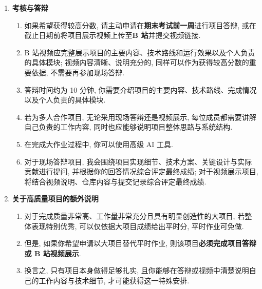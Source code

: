 \documentclass{../nndlcourse}
\begin{document}
\begin{enumerate}
	\item \textbf{考核与答辩}
	\begin{enumerate}
		\item 如果希望获得较高分数, 请主动申请在\textbf{期末考试前一周}进行项目答辩, 或在截止日期前将项目展示视频上传至\textbf{B 站}并提交视频链接.
		\item B 站视频应完整展示项目的主要内容、技术路线和运行效果以及个人负责的具体模块; 视频内容清晰、说明充分的, 同样可以作为获得较高分数的重要依据, 不需要再参加现场答辩.
		\item 答辩时间约为 10 分钟, 你需要介绍项目的主要内容、技术路线、完成情况以及个人负责的具体模块.
		\item 若为多人合作项目, 无论采用现场答辩还是视频展示, 每位成员都需要讲解自己负责的工作内容, 同时也应能够说明项目整体思路与系统结构.
		\item 在完成大作业过程中, 你可以使用高级 AI 工具.
		\item 对于现场答辩项目, 我会围绕项目实现细节、技术方案、关键设计与实际贡献进行提问, 并根据你的回答情况综合评定最终成绩; 对于视频展示项目, 将结合视频说明、仓库内容与提交记录综合评定最终成绩.
	\end{enumerate}

	\item \textbf{关于高质量项目的额外说明}
	\begin{enumerate}
		\item 对于完成质量非常高、工作量非常充分且具有明显创造性的大项目, 若整体表现特别优秀, 可以仅依据大项目成绩给出平时分, 平时作业可免做.
		\item 但是, 如果你希望申请以大项目替代平时作业, 则该项目\textbf{必须完成项目答辩或 B 站视频展示}.
		\item 换言之, 只有项目本身做得足够扎实, 且你能够在答辩或视频中清楚说明自己的工作内容与技术细节, 才可能获得这一特殊安排.
	\end{enumerate}
\end{enumerate}
\end{document}

